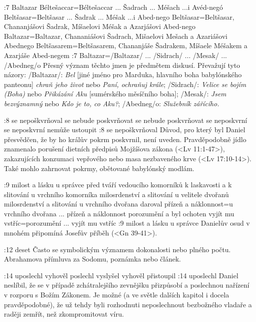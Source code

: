 :7
    {Baltazar}  %
    {Béltešaccar}={Béltešaccar ... Šadrach ... Méšach ...i Avéd-negó} %
    {Beltšasar}={Beltšasar ... Šadrak ... Méšak ...i Abed-nego}  %
    {Beltšasar}={Beltšasar, Chananjášovi Šadrak, Míšaelovi Méšak a Azarjášovi Abed-nego} %
    {Baltazar}={Baltazar, Chananiášovi Šadrach, Mišaelovi Mešach a Azariášovi Abednego}  %
    {Beltšasarem}={Beltšasarem, Chananjáše Šadrakem, Míšaele Méšakem a Azarjáše Abed-negem}  %
:7  {Baltazar}={\x/Baltazar/ ... \x/Sidrach/ ... \x/Mesak/ ...  \x/Abedneg/o}
     Přesný význam těchto jmen je předmětem diskusí. Převažují tyto názory: 
     \x/Baltazar/: {\em Bel} [jiné jméno pro Marduka, hlavního boha babylónského panteonu]
     {\em chraň jeho život} nebo {\em Paní, ochraňuj krále}; 
     \x/Sidrach/: {\em Velice se bojím (Boha)} nebo {\em Přikázání Aku} [sumérského měsíčního boha];
     \x/Mesak/:   {\em Jsem bezvýznamný} nebo {\em Kdo je to, co Aku?};
     \x/Abedneg/o: {\em Služebník zářícího.}
     
:8
    {se nepoškvrňoval}  %
    {se nebude poskvrňovat} %
    {se nebude poskvrňovat}  %
    {se neposkvrní} %
    {se neposkvrní}  %
    {nemůže ustoupit}  %
:8 {se nepoškvrňoval} Důvod, pro který byl Daniel přesvědčen, že by ho králův pokrm poskvrnil, není uveden. Pravděpodobně jídlo znamenalo porušení dietních předpisů Mojžíšova zákona  (<Lv 11:1-47>), zakazujících konzumaci vepřového nebo masa nezbaveného krve (<Lv 17:10-14>). Také mohlo zahrnovat pokrmy, obětované babylónský modlám. 

:9
    {milost a lásku u správce}  %
    {před tváří vedoucího komorníků k laskavosti a k slitování} %
    {u vrchního komorníka milosrdenství a slitování}  %
    {u velitele dvořanů milosrdenství a slitování} %
    {u vrchního dvořana daroval přízeň a náklonnost}={u vrchního dvořana ... přízeň a náklonnost}  %
    {porozumění a byl ochoten vyjít mu vstříc}={porozumění ... vyjít mu vstříc}  %
:9 {milost a lásku u správce} Danielův osud v mnohém připomíná Josefův příběh (<Gn 39-41>).

:12 {deset} Často se symbolickým významem dokonalosti nebo plného počtu. \dopsat  Abrahamova přímluva za Sodomu, poznámka nebo článek.

:14
    {uposlechl}  %
    {vyhověl} %
    {poslechl}  %
    {vyslyšel} %
    {vyhověl}  %
    {přistoupil}  %
:14 {uposlechl} Daniel neslíbil, že se v případě zchátralejšího zevnějšku přizpůsobí a poslechnou nařízení v rozporu s Božím Zákonem. Je možné (a ve světle dalších kapitol i docela pravděpodobné), že už tehdy byli rozhodnuti neposlechnout bezbožného vladaře a raději zemřít, než zkompromitovat víru.

